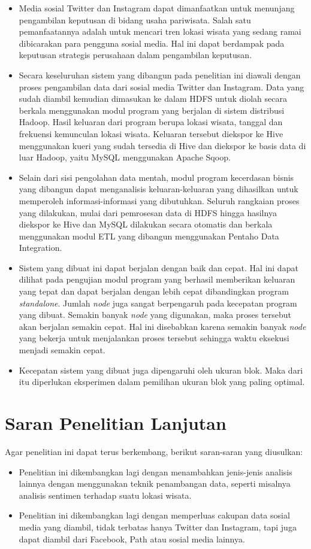 \begin{itemize}
	\item Media sosial Twitter dan Instagram dapat dimanfaatkan untuk menunjang pengambilan keputusan di bidang usaha pariwisata. Salah satu pemanfaatannya adalah untuk mencari tren lokasi wisata yang sedang ramai dibicarakan para pengguna sosial media. Hal ini dapat berdampak pada keputusan strategis perusahaan dalam pengambilan keputusan.
	\item Secara keseluruhan sistem yang dibangun pada penelitian ini diawali dengan proses pengambilan data dari sosial media Twitter dan Instagram. Data yang sudah diambil kemudian dimasukan ke dalam HDFS untuk diolah secara berkala menggunakan modul program yang berjalan di sistem distribusi Hadoop. Hasil keluaran dari program berupa lokasi wisata, tanggal dan frekuensi kemunculan lokasi wisata. Keluaran tersebut diekspor ke Hive menggunakan kueri yang sudah tersedia di Hive dan diekspor ke basis data di luar Hadoop, yaitu MySQL menggunakan Apache Sqoop. 
	\item Selain dari sisi pengolahan data mentah, modul program kecerdasan bisnis yang dibangun dapat menganalisis keluaran-keluaran yang dihasilkan untuk memperoleh informasi-informasi yang dibutuhkan. Seluruh rangkaian proses yang dilakukan, mulai dari pemrosesan data di HDFS hingga hasilnya diekspor ke Hive dan MySQL dilakukan secara otomatis dan berkala menggunakan modul ETL yang dibangun menggunakan Pentaho Data Integration.
	\item Sistem yang dibuat ini dapat berjalan dengan baik dan cepat. Hal ini dapat dilihat pada pengujian modul program yang berhasil memberikan keluaran yang tepat dan dapat berjalan dengan lebih cepat dibandingkan program \textit{standalone}. Jumlah \textit{node} juga sangat berpengaruh pada kecepatan program yang dibuat. Semakin banyak \textit{node} yang digunakan, maka proses tersebut akan berjalan semakin cepat. Hal ini disebabkan karena semakin banyak \textit{node} yang bekerja untuk menjalankan proses tersebut sehingga waktu eksekusi menjadi semakin cepat.
	\item Kecepatan sistem yang dibuat juga dipengaruhi oleh ukuran blok. Maka dari itu diperlukan eksperimen dalam pemilihan ukuran blok yang paling optimal.
\end{itemize}



\section{Saran Penelitian Lanjutan}
Agar penelitian ini dapat terus berkembang, berikut saran-saran yang diusulkan:
\begin{itemize}
	\item Penelitian ini dikembangkan lagi dengan menambahkan jenis-jenis analisis lainnya dengan menggunakan teknik penambangan data, seperti misalnya analisis sentimen terhadap suatu lokasi wisata.
	\item Penelitian ini dikembangkan lagi dengan memperluas cakupan data sosial media yang diambil, tidak terbatas hanya Twitter dan Instagram, tapi juga dapat diambil dari Facebook, Path atau sosial media lainnya.
\end{itemize}